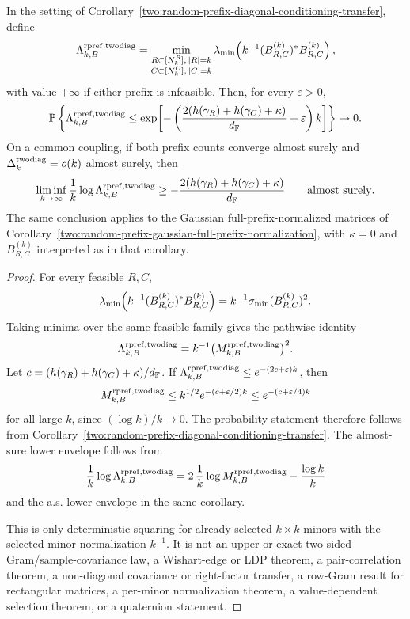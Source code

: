 \begin{corollary}\label{two:random-prefix-normalized-gram-transfer}
In the setting of
Corollary~\ref{two:random-prefix-diagonal-conditioning-transfer}, define
\[
  \Lambda_{k,B}^{\rm rpref,twodiag}
  =
  \min_{\substack{R\subset[N_k^R],\, |R|=k\\
                  C\subset[N_k^C],\, |C|=k}}
  \lambda_{\min}\!\left(k^{-1}(B_{R,C}^{(k)})^*B_{R,C}^{(k)}\right),
\]
with value \(+\infty\) if either prefix is infeasible.  Then, for every
\(\varepsilon>0\),
\[
  \mathbb{P}\left\{
  \Lambda_{k,B}^{\rm rpref,twodiag}\le
  \exp\!\left[-\left(
  \frac{2(h(\gamma_R)+h(\gamma_C)+\kappa)}{d_{\mathbb{F}}}
  +\varepsilon
  \right)k\right]\right\}\to0.
\]
On a common coupling, if both prefix counts converge almost surely and
\(\Delta_k^{\rm twodiag}=o(k)\) almost surely, then
\[
  \liminf_{k\to\infty}\frac1k\log \Lambda_{k,B}^{\rm rpref,twodiag}
  \ge
  -\frac{2(h(\gamma_R)+h(\gamma_C)+\kappa)}{d_{\mathbb{F}}}
  \qquad\hbox{almost surely}.
\]
The same conclusion applies to the Gaussian full-prefix-normalized matrices of
Corollary~\ref{two:random-prefix-gaussian-full-prefix-normalization}, with
\(\kappa=0\) and \(B_{R,C}^{(k)}\) interpreted as in that corollary.
\end{corollary}

\begin{proof}
For every feasible \(R,C\),
\[
  \lambda_{\min}\!\left(k^{-1}(B_{R,C}^{(k)})^*B_{R,C}^{(k)}\right)
  =
  k^{-1}\sigma_{\min}(B_{R,C}^{(k)})^2.
\]
Taking minima over the same feasible family gives the pathwise identity
\[
  \Lambda_{k,B}^{\rm rpref,twodiag}
  =
  k^{-1}\bigl(M_{k,B}^{\rm rpref,twodiag}\bigr)^2 .
\]
Let \(c=(h(\gamma_R)+h(\gamma_C)+\kappa)/d_{\mathbb{F}}\).  If
\(\Lambda_{k,B}^{\rm rpref,twodiag}\le e^{-(2c+\varepsilon)k}\), then
\[
  M_{k,B}^{\rm rpref,twodiag}
  \le
  k^{1/2}e^{-(c+\varepsilon/2)k}
  \le
  e^{-(c+\varepsilon/4)k}
\]
for all large \(k\), since \((\log k)/k\to0\).  The probability statement
therefore follows from
Corollary~\ref{two:random-prefix-diagonal-conditioning-transfer}.  The
almost-sure lower envelope follows from
\[
  \frac1k\log \Lambda_{k,B}^{\rm rpref,twodiag}
  =
  2\,\frac1k\log M_{k,B}^{\rm rpref,twodiag}
  -\frac{\log k}{k}
\]
and the a.s. lower envelope in the same corollary.

This is only deterministic squaring for already selected \(k\times k\) minors
with the selected-minor normalization \(k^{-1}\).  It is not an upper or exact
two-sided Gram/sample-covariance law, a Wishart-edge or LDP theorem, a
pair-correlation theorem, a non-diagonal covariance or right-factor transfer, a
row-Gram result for rectangular matrices, a per-minor normalization theorem, a
value-dependent selection theorem, or a quaternion statement.
\end{proof}

